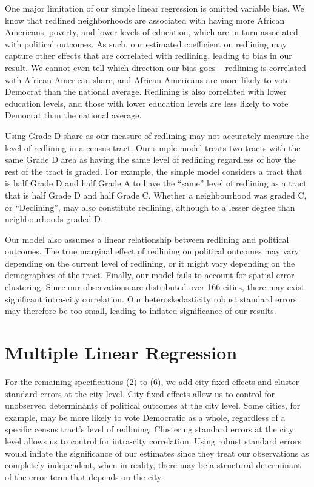 \documentclass{eco_375_paper}
\begin{document}
One major limitation of our simple linear regression is omitted variable bias. We know that redlined neighborhoods are associated with having more African Americans, poverty, and lower levels of education, which are in turn associated with political outcomes. As such, our estimated coefficient on redlining may capture other effects that are correlated with redlining, leading to bias in our result. We cannot even tell which direction our bias goes – redlining is correlated with African American share, and African Americans are more likely to vote Democrat than the national average. Redlining is also correlated with lower education levels, and those with lower education levels are less likely to vote Democrat than the national average.

Using Grade D share as our measure of redlining may not accurately measure the level of redlining in a census tract. Our simple model treats two tracts with the same Grade D area as having the same level of redlining regardless of how the rest of the tract is graded. For example, the simple model considers a tract that is half Grade D and half Grade A to have the “same” level of redlining as a tract that is half Grade D and half Grade C. Whether a neighbourhood was graded C, or “Declining”,  may also constitute redlining, although to a lesser degree than neighbourhoods graded D.

Our model also assumes a linear relationship between redlining and political outcomes. The true marginal effect of redlining on political outcomes may vary depending on the current level of redlining, or it might vary depending on the demographics of the tract. Finally, our model fails to account for spatial error clustering. Since our observations are distributed over 166 cities, there may exist significant intra-city correlation. Our heteroskedasticity robust standard errors may therefore be too small, leading to inflated significance of our results.
\section*{Multiple Linear Regression}
For the remaining specifications (2) to (6), we add city fixed effects and cluster standard errors at the city level. City fixed effects allow us to control for unobserved determinants of political outcomes at the city level. Some cities, for example, may be more likely to vote Democratic as a whole, regardless of a specific census tract’s level of redlining. Clustering standard errors at the city level allows us to control for intra-city correlation. Using robust standard errors would inflate the significance of our estimates since they treat our observations as completely independent, when in reality, there may be a structural determinant of the error term that depends on the city.
\end{document}
